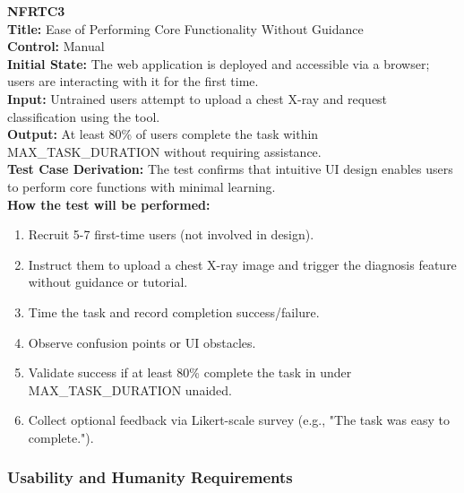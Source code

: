 \documentclass[12pt, titlepage]{article}
\begin{document}
\textbf{NFRTC3}\\
\textbf{Title:} Ease of Performing Core Functionality Without Guidance\\
\textbf{Control:} Manual\\
\textbf{Initial State:} The web application is deployed and accessible via a browser; users are interacting with it for the first time.\\
\textbf{Input:} Untrained users attempt to upload a chest X-ray and request classification using the tool.\\
\textbf{Output:} At least 80\% of users complete the task within MAX\_TASK\_DURATION without requiring assistance.\\
\textbf{Test Case Derivation:} The test confirms that intuitive UI design enables users to perform core functions with minimal learning.\\
\textbf{How the test will be performed:}
\begin{enumerate}
  \item Recruit 5-7 first-time users (not involved in design).
  \item Instruct them to upload a chest X-ray image and trigger the diagnosis feature without guidance or tutorial.
  \item Time the task and record completion success/failure.
  \item Observe confusion points or UI obstacles.
  \item Validate success if at least 80\% complete the task in under MAX\_TASK\_DURATION unaided.
  \item Collect optional feedback via Likert-scale survey (e.g., "The task was easy to complete.").
\end{enumerate}

\vspace{1em}

\subsubsection{Usability and Humanity Requirements}
\end{document}
